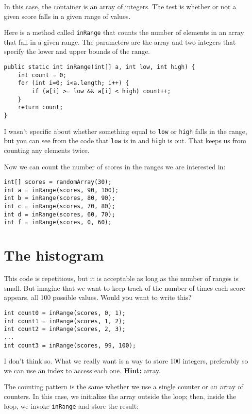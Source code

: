 \documentclass[12pt]{book}
\def\HINT{\textbf{Hint:}}
\theoremstyle{definition}
\begin{document}
In this case, the container is an array of integers.  The
test is whether or not a given score falls in a given range of
values.

Here is a method called {\tt inRange} that counts the number of
elements in an array that fall in a given range.  The parameters are
the array and two integers that specify the lower and upper bounds of
the range.

\begin{lstlisting}
public static int inRange(int[] a, int low, int high) {
    int count = 0;
    for (int i=0; i<a.length; i++) {
        if (a[i] >= low && a[i] < high) count++;
    }
    return count;
}
\end{lstlisting}
%
I wasn't specific about whether something equal
to {\tt low} or {\tt high} falls in the range, but you can
see from the code that {\tt low} is in and {\tt high} is out.
That keeps us from counting any elements twice.

Now we can count the number of scores in the ranges we are
interested in:

\begin{lstlisting}
int[] scores = randomArray(30);
int a = inRange(scores, 90, 100);
int b = inRange(scores, 80, 90);
int c = inRange(scores, 70, 80);
int d = inRange(scores, 60, 70);
int f = inRange(scores, 0, 60);
\end{lstlisting}


\section{The histogram}

This code is repetitious, but it is acceptable as
long as the number of ranges is small.  But imagine that
we want to keep track of the number of times each score appears,
all 100 possible values.  Would you want to write this?

\begin{lstlisting}
int count0 = inRange(scores, 0, 1);
int count1 = inRange(scores, 1, 2);
int count2 = inRange(scores, 2, 3);
...
int count3 = inRange(scores, 99, 100);
\end{lstlisting}

I don't think so.  What we really want is a way to store 100 integers,
preferably so we can use an index to access each one.  \HINT{} array.

The counting pattern is the same whether we use a single counter or an
array of counters.  In this case, we initialize the array outside the
loop; then, inside the loop, we invoke {\tt inRange} and store the
result:
\end{document}
